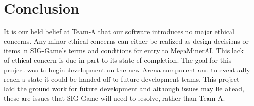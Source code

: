 \documentclass{article}
\begin{document}
\section{Conclusion}
It is our held belief at Team-A that our software introduces no major ethical concerns. Any minor ethical concerns can either be realized as design decisions or items in SIG-Game's terms and conditions for entry to MegaMinerAI. This lack of ethical concern is due in part to its state of completion. The goal for this project was to begin development on the new Arena component and to eventually reach a state it could be handed off to future development teams. This project laid the ground work for future development and although issues may lie ahead, these are issues that SIG-Game will need to resolve, rather than Team-A.
\end{document}
